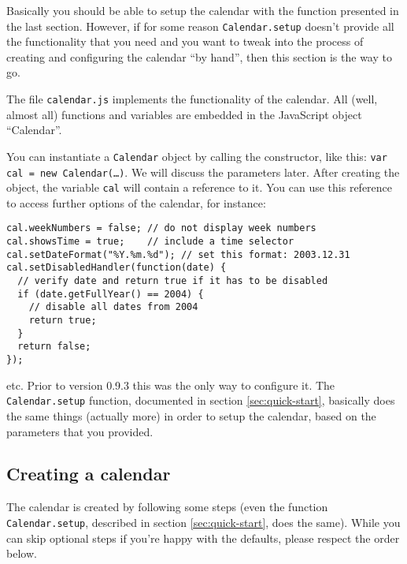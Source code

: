 \documentclass[a4paper,10pt]{article}
\begin{document}
Basically you should be able to setup the calendar with the function presented
in the last section.  However, if for some reason \texttt{Calendar.setup}
doesn't provide all the functionality that you need and you want to tweak into
the process of creating and configuring the calendar ``by hand'', then this
section is the way to go.

The file \texttt{calendar.js} implements the functionality of the calendar.
All (well, almost all) functions and variables are embedded in the JavaScript
object ``Calendar''.

You can instantiate a \texttt{Calendar} object by calling the constructor, like
this: \texttt{var cal = new Calendar(\ldots)}.  We will discuss the parameters
later.  After creating the object, the variable \texttt{cal} will contain a
reference to it.  You can use this reference to access further options of the
calendar, for instance:

\begin{verbatim}
cal.weekNumbers = false; // do not display week numbers
cal.showsTime = true;    // include a time selector
cal.setDateFormat("%Y.%m.%d"); // set this format: 2003.12.31
cal.setDisabledHandler(function(date) {
  // verify date and return true if it has to be disabled
  if (date.getFullYear() == 2004) {
    // disable all dates from 2004
    return true;
  }
  return false;
});
\end{verbatim}

\noindent etc.  Prior to version
0.9.3 this was the only way to configure it.  The \texttt{Calendar.setup}
function, documented in section \ref{sec:quick-start}, basically does the same
things (actually more) in order to setup the calendar, based on the parameters
that you provided.

\subsection{Creating a calendar}

The calendar is created by following some steps (even the function
\texttt{Calendar.setup}, described in section \ref{sec:quick-start}, does the
same).  While you can skip optional steps if you're happy with the defaults,
please respect the order below.
\end{document}
